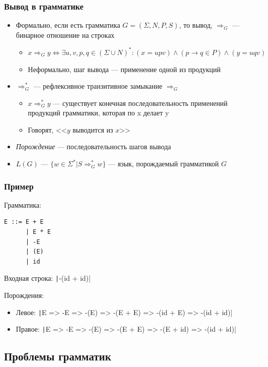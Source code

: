 \documentclass[xetex,mathserif,serif]{beamer}
\begin{document}
	\begin{frame}
		\frametitle{Вывод в грамматике}
		\begin{itemize}
			\item Формально, если есть грамматика $G = (\Sigma, N, P, S)$, то вывод, $\Rightarrow_G$ --- бинарное отношение на строках
			\begin{itemize}
				\item $x \Rightarrow_G y \iff \exists u, v, p, q \in (\Sigma \cup N)^*: (x = upv) \wedge (p \rightarrow q \in P) \wedge (y = uqv)$
				\item Неформально, шаг вывода --- применение одной из продукций
			\end{itemize}
			\item $\Rightarrow_G^*$ --- рефлексивное транзитивное замыкание $\Rightarrow_G$
			\begin{itemize}
				\item $x \Rightarrow_G^* y$ --- существует конечная последовательность применений продукций грамматики, которая по x делает y
				\item Говорят, <<$y$ выводится из $x$>>
			\end{itemize}
			\item \textit{Порождение} --- последовательность шагов вывода
			\item $L(G)$ --- $\{w \in \Sigma^* | S \Rightarrow_G^* w\}$ --- язык, порождаемый грамматикой $G$
		\end{itemize}
	\end{frame}

	\begin{frame}[fragile]
		\frametitle{Пример}
		Грамматика:
		\begin{verbatim}
E ::= E + E
      | E * E
      | -E
      | (E)
      | id
		\end{verbatim}
		
		Входная строка: \texttt|-(id + id)|
		
		Порождения:
		\begin{itemize}
			\item Левое: \texttt|E => -E => -(E) => -(E + E) => -(id + E) => -(id + id)|
			\item Правое: \texttt|E => -E => -(E) => -(E + E) => -(E + id) => -(id + id)|
		\end{itemize}
	\end{frame}

	\subsection{Проблемы грамматик}
\end{document}
